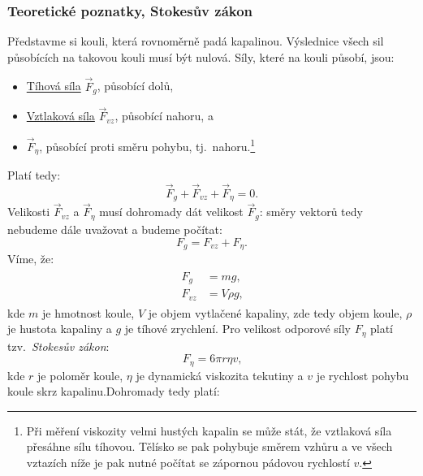 \documentclass[12pt]{article}
\begin{document}
\subsubsection{Teoretické poznatky, Stokesův zákon}%

Představme si kouli, která rovnoměrně padá kapalinou. Výslednice všech sil působících na takovou kouli musí být nulová. Síly, které na kouli působí, jsou:
\begin{itemize}[noitemsep, topsep = 0pt]
    \item \underline{Tíhová síla} $\vec{F}_g$, působící dolů,
    \item \underline{Vztlaková síla} $\vec{F}_{vz}$, působící nahoru, a
    \item \underline{} $\vec{F}_\eta$, působící proti směru pohybu, tj.~nahoru.\footnote{Při měření viskozity velmi hustých kapalin se může stát, že vztlaková síla přesáhne sílu tíhovou. Tělísko se pak pohybuje směrem vzhůru a ve všech vztazích níže je pak nutné počítat se zápornou pádovou rychlostí $v$.}
\end{itemize}
Platí tedy:
\begin{equation}
    \vec{F}_g + \vec{F}_{vz} + \vec{F}_\eta = 0\text{.}
\end{equation}
Velikosti $\vec{F}_{vz}$ a $\vec{F}_\eta$ musí dohromady dát velikost $\vec{F}_g$: směry vektorů tedy nebudeme dále uvažovat a budeme počítat:
\begin{equation}
    F_g = F_{vz} + F_\eta\text{.}
\end{equation}
Víme, že:
\begin{align}
    \begin{split}
        F_g &= mg\text{,}\\
        F_{vz} &= V\rho g\text{,}
    \end{split}
\end{align}
kde $m$ je hmotnost koule, $V$ je objem vytlačené kapaliny, zde tedy objem koule, $\rho$ je hustota kapaliny a $g$ je tíhové zrychlení. Pro velikost odporové síly $F_\eta$ platí tzv.~\emph{Stokesův zákon}:~\cite{book:Calibration_of_viscometers}\cite{wiki:Stokes_law}
\begin{equation}
    F_\eta = 6\pi r\eta v\text{,}
\end{equation}
kde $r$ je poloměr koule, $\eta$ je dynamická viskozita tekutiny a $v$ je rychlost pohybu koule skrz kapalinu.\footnotemark Dohromady tedy platí:
\end{document}
